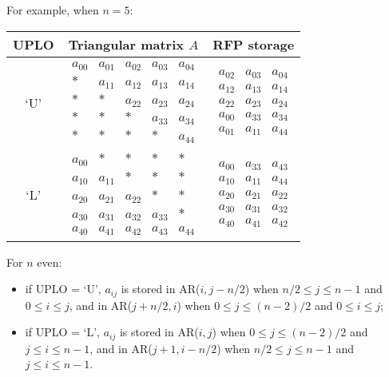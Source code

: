 For example, when $n = 5$:
\begin{center}
\begin{tabular}{|c|c|c|} \hline
UPLO & Triangular matrix $A$ & RFP storage \\ \hline
`U' &
$
\begin{array}{ccccc}
  a_{00} & a_{01} & a_{02} & a_{03} & a_{04} \\
   \ast     & a_{11} & a_{12} & a_{13} & a_{14} \\   
   \ast     & \ast      & a_{22} & a_{23} & a_{24} \\      
   \ast     & \ast      & \ast      & a_{33} & a_{34} \\      
   \ast     & \ast      & \ast      & \ast      & a_{44}      
\end{array}
$
&
$
\begin{array}{ccc}
a_{02} & a_{03} & a_{04} \\
a_{12} & a_{13} & a_{14} \\
a_{22} & a_{23} & a_{24} \\
a_{00} & a_{33} & a_{34} \\
a_{01} & a_{11} & a_{44}
\end{array} 
$
\\ \hline
`L' &
$
\begin{array}{ccccc}     
  a_{00} & \ast      & \ast      & \ast      & \ast      \\
  a_{10} & a_{11} & \ast      & \ast      & \ast      \\
  a_{20} & a_{21} & a_{22} & \ast      & \ast      \\
  a_{30} & a_{31} & a_{32} & a_{33} & \ast      \\
  a_{40} & a_{41} & a_{42} & a_{43} & a_{44} 
\end{array}
$ 
&
$
\begin{array}{ccc}
  a_{00} & a_{33} & a_{43} \\ 
  a_{10} & a_{11} & a_{44} \\
  a_{20} & a_{21} & a_{22} \\
  a_{30} & a_{31} & a_{32} \\
  a_{40} & a_{41} & a_{42} 
\end{array}
$
\\ \hline
\end{tabular}
\end{center}

For $n$ even:

\begin {itemize}
\item if UPLO = `U',
$a_{ij}$ is stored in AR($i,j - n/2$) when $n/2 \leq j \leq n-1$ and $0 \leq i \leq j$,
and in AR($j+n/2,i$) when $0 \leq j \leq (n-2)/2$ and $0 \leq i \leq j$;
\item if UPLO = `L',
$a_{ij}$ is stored in AR($i,j$) when $0 \leq j \leq  (n-2)/2$ and $j \leq i \leq n-1$,
and in AR($j+1,i-n/2$) when $n/2 \leq j \leq n-1$ and $j \leq i \leq n-1$.
\end{itemize}

